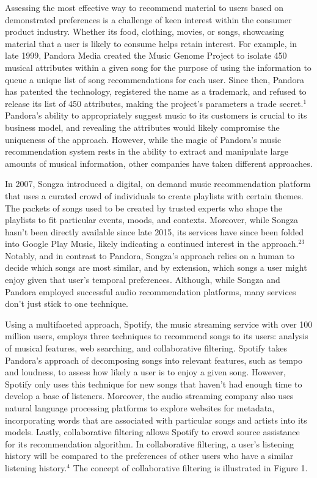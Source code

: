\documentclass{amsart}
\theoremstyle{plain}
\theoremstyle{definition}
\begin{document}
   	Assessing the most effective way to recommend material to users based on demonstrated preferences is a challenge of keen interest within the consumer product industry. Whether its food, clothing, movies, or songs, showcasing material that a user is likely to consume helps retain interest. For example, in late 1999, Pandora Media created the Music Genome Project to isolate 450 musical attributes within a given song for the purpose of using the information to queue a unique list of song recommendations for each user. Since then, Pandora has patented the technology, registered the name as a trademark, and refused to release its list of 450 attributes, making the project's parameters a trade secret.$^{1}$ Pandora's ability to appropriately suggest music to its customers is crucial to its business model, and revealing the attributes would likely compromise the uniqueness of the approach. However, while the magic of Pandora's music recommendation system rests in the ability to extract and manipulate large amounts of musical information, other companies have taken different approaches.
   	
   	In 2007, Songza introduced a digital, on demand music recommendation platform that uses a curated crowd of individuals to create playlists with certain themes. The packets of songs used to be created by trusted experts who shape the playlists to fit particular events, moods, and contexts. Moreover, while Songza hasn't been directly available since late 2015, its services have since been folded into Google Play Music, likely indicating a continued interest in the approach.$^{23}$ Notably, and in contrast to Pandora, Songza's approach relies on a human to decide which songs are most similar, and by extension, which songs a user might enjoy given that user's temporal preferences. Although, while Songza and Pandora employed successful audio recommendation platforms, many services don't just stick to one technique.
   	
   	Using a multifaceted approach, Spotify, the music streaming service with over 100 million users, employs three techniques to recommend songs to its users: analysis of musical features, web searching, and collaborative filtering. Spotify takes Pandora's approach of decomposing songs into relevant features, such as tempo and loudness, to assess how likely a user is to enjoy a given song. However, Spotify only uses this technique for new songs that haven't had enough time to develop a base of listeners. Moreover, the audio streaming company also uses natural language processing platforms to explore websites for metadata, incorporating words that are associated with particular songs and artists into its models. Lastly, collaborative filtering allows Spotify to crowd source assistance for its recommendation algorithm. In collaborative filtering, a user's listening history will be compared to the preferences of other users who have a similar listening history.$^{4}$ The concept of collaborative filtering is illustrated in Figure 1.
   	
\end{document}
